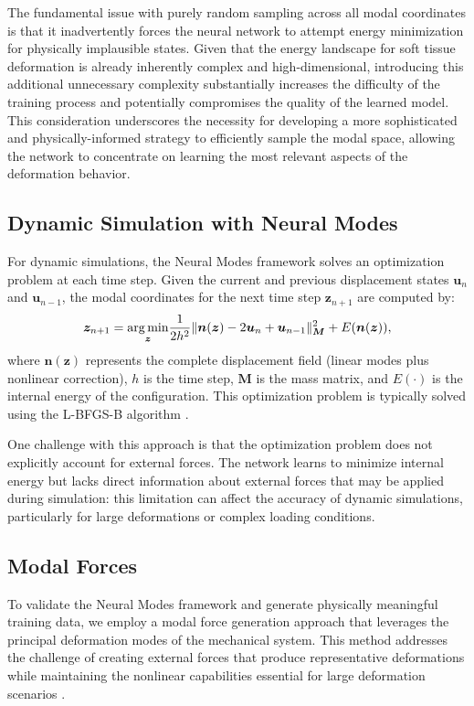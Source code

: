 The fundamental issue with purely random sampling across all modal coordinates is that it inadvertently forces the neural network to attempt energy minimization for physically implausible states. Given that the energy landscape for soft tissue deformation is already inherently complex and high-dimensional, introducing this additional unnecessary complexity substantially increases the difficulty of the training process and potentially compromises the quality of the learned model. This consideration underscores the necessity for developing a more sophisticated and physically-informed strategy to efficiently sample the modal space, allowing the network to concentrate on learning the most relevant aspects of the deformation behavior.


\subsection{Dynamic Simulation with Neural Modes}
For dynamic simulations, the Neural Modes framework solves an optimization problem at each time step. Given the current and previous displacement states $\bm{u}_n$ and $\bm{u}_{n-1}$, the modal coordinates for the next time step $\bm{z}_{n+1}$ are computed by:
\begin{equation}
    \bm{z}_{n+1} = \underset{\bm{z}}{\operatorname*{arg\,min}} \frac{1}{2h^2} \|\bm{n}(\bm{z}) - 2\bm{u}_n + \bm{u}_{n-1}\|_{\bm{M}}^2 + E(\bm{n}(\bm{z})),
    \label{eq:optimization_problem}
\end{equation}
where $\bm{n}(\bm{z})$ represents the complete displacement field (linear modes plus nonlinear correction), $h$ is the time step, $\bm{M}$ is the mass matrix, and $E(\cdot)$ is the internal energy of the configuration. This optimization problem is typically solved using the L-BFGS-B algorithm \cite{Liu_1989}.

One challenge with this approach is that the optimization problem does not explicitly account for external forces. The network learns to minimize internal energy but lacks direct information about external forces that may be applied during simulation: this limitation can affect the accuracy of dynamic simulations, particularly for large deformations or complex loading conditions.



\subsection{Modal Forces}

To validate the Neural Modes framework and generate physically meaningful training data, we employ a modal force generation approach that leverages the principal deformation modes of the mechanical system. This method addresses the challenge of creating external forces that produce representative deformations while maintaining the nonlinear capabilities essential for large deformation scenarios \cite{odotDeepPhysicsPhysicsAware2021}.

